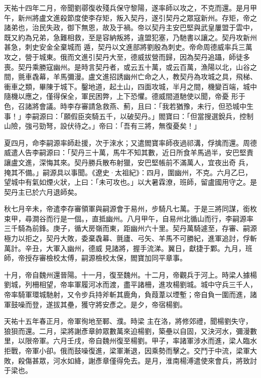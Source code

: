 \begin{pinyinscope}
 天祐十四年二月，帝聞劉鄩復收殘兵保守黎陽，遂率師以攻之，不克而還。是月甲午，新州將盧文進殺節度使李存矩，叛入契丹，遂引契丹之眾寇新州。存矩，帝之諸弟也，治民失政，御下無恩，故及于禍。帝以契丹主安巴堅與武皇屢盟于雲中，既又約為兄弟，急難相救，至是容納叛將，違盟犯塞，乃馳書以讓之。契丹攻新州甚急，刺史安金全棄城而
 遁，契丹以文進部將劉殷為刺史。帝命周德威率兵三萬攻之，營于城東。俄而文進引契丹大至，德威拔營而歸，因為契丹追躡，師徒多喪。契丹乘勝寇幽州。是時言契丹者，或云五十萬，或云百萬，漁陽以北，山谷之間，氈車毳幕，羊馬彌漫。盧文進招誘幽州亡命之人，教契丹為攻城之具，飛梯、衝車之類，畢陳于城下。鑿地道，起土山，四面攻城，半月之間，機變百端，城中隨機以應之，僅得保全，軍民困弊，上下恐懼。德威間道馳使以聞，帝憂
 形于色，召諸將會議。時李存審請急救燕、薊，且曰：「我若猶豫，未行，但恐城中生事！」李嗣源曰：「願假臣突騎五千，以破契丹。」閻寶曰：「但當搜選銳兵，控制山險，強弓勁弩，設伏待之。」帝曰：「吾有三將，無復憂矣！」



 夏四月，命李嗣源率師赴援，次于淶水；又遣閻寶率師夜過祁溝，俘擒而還。周德威遣人告李嗣源曰：「契丹三十萬，馬牛不知其數，近日所食羊馬過半，安巴堅責讓盧文進，深悔其來。契丹勝兵散布射獵，安巴堅帳前不滿萬人，宜夜出奇
 兵，掩其不備。」嗣源具以事聞。《遼史·太祖紀》：四月，圍幽州，不克。六月乙巳，望城中有氣如煙火狀，上曰：「未可攻也。」以大暑霖潦，班師，留盧國用守之。是契丹主已於六月退師矣。



 秋七月辛未，帝遣李存審領軍與嗣源會于易州，步騎凡七萬。于是三將同謀，銜枚束甲，尋澗谷而行是一個。，直抵幽州。八月甲午，自易州北循山而行，李嗣源率三千騎為前鋒。庚子，循大房嶺而東，距幽州六十里。契丹萬騎遽至，存審、嗣源極力以拒之，契丹大敗，委棄毳幕、氈廬、弓矢、羊馬不可勝紀，進軍追討，俘斬萬計。辛丑，大軍入幽州，德威
 見諸將，握手流涕。翼日，獻捷于鄴。九月，班師，帝授存審檢校太傅，嗣源檢校太保，閻寶加同平章事。



 十月，帝自魏州還晉陽。十一月，復至魏州。十二月，帝觀兵于河上。時梁人據楊劉城，列柵相望，帝率軍履河冰而渡，盡平諸柵，進攻楊劉城。城中守兵三千人，帝率騎軍環城馳射，又令步兵持斧斬其鹿角，負葭葦以堙塹；帝自負一圍而進，諸軍鼓噪而登，遂拔其壘，獲守將安彥之。是夕，帝宿楊劉。



 天祐十五年春正月，帝軍徇地至鄆、濮。時梁
 主在洛，將修郊禮，聞楊劉失守，狼狽而還。二月，梁將謝彥章帥眾數萬來迫楊劉，築壘以自固，又決河水，彌漫數里，以限帝軍。六月壬戌，帝自魏州復至楊劉。甲子，率諸軍涉水而進，梁人臨水拒戰，帝軍小卻。俄而鼓噪復進，梁軍漸退，因乘勢而擊之。交鬥于中流，梁軍大敗，殺傷甚眾，河水如絳，謝彥章僅得免去。是月，淮南楊溥遣使來會兵，將致討于梁也。




\end{pinyinscope}
